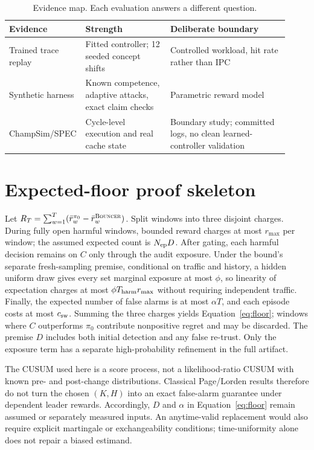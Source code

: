 \documentclass{article}
\newcommand{\pizero}{\pi_0}
\newcommand{\rmax}{r_{\max}}
\newcommand{\system}{\textsc{Bouncer}\xspace}
\begin{document}
\begin{table}[h]
\caption{Evidence map.  Each evaluation answers a different question.}
\label{tab:evidence}
\centering
\small
\begin{tabular}{@{}p{0.20\linewidth}p{0.30\linewidth}p{0.42\linewidth}@{}}
\toprule
Evidence & Strength & Deliberate boundary \\
\midrule
Trained trace replay & Fitted controller; 12 seeded concept shifts & Controlled
workload, hit rate rather than IPC \\
Synthetic harness & Known competence, adaptive attacks, exact claim checks &
Parametric reward model \\
ChampSim/SPEC & Cycle-level execution and real cache state & Boundary study;
committed logs, no clean learned-controller validation \\
\bottomrule
\end{tabular}
\end{table}

\section{Expected-floor proof skeleton}
\label{app:theory}

Let $R_T=\sum_{w=1}^T(\bar r_w^{\pizero}-\bar r_w^{\system})$.  Split windows
into three disjoint charges.  During fully open harmful windows, bounded reward
charges at most $\rmax$ per window; the assumed expected count is
$N_{\rm ep}D$.  After gating, each harmful decision remains on $C$ only through
the audit exposure.  Under the bound's separate fresh-sampling premise,
conditional on traffic and history, a hidden uniform draw gives every set
marginal exposure at most $\phi$, so linearity of expectation charges at most
$\phi T_{\rm harm}\rmax$ without requiring independent traffic.
Finally, the expected number of false alarms is at most $\alpha T$, and each
episode costs at most $c_{\rm sw}$.  Summing the three charges yields
Equation~\ref{eq:floor}; windows where $C$ outperforms $\pizero$ contribute
nonpositive regret and may be discarded.  The premise $D$ includes both initial
detection and any false re-trust.  Only the exposure term has a separate
high-probability refinement in the full artifact.

The CUSUM used here is a score process, not a likelihood-ratio CUSUM with known
pre- and post-change distributions.  Classical Page/Lorden results therefore do
not turn the chosen $(K,H)$ into an exact false-alarm guarantee under dependent
leader rewards.  Accordingly, $D$ and $\alpha$ in Equation~\ref{eq:floor} remain
assumed or separately measured inputs.  An anytime-valid replacement would also
require explicit martingale or exchangeability conditions; time-uniformity alone
does not repair a biased estimand.
\end{document}
